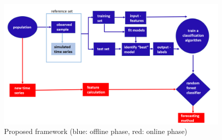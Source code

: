\documentclass[11pt,]{article}
\theoremstyle{definition}
\theoremstyle{definition}
\theoremstyle{definition}
\theoremstyle{remark}
\begin{document}
\begin{figure}

{\centering \includegraphics[width=\textwidth]{figures/framework} 

}

\caption{Proposed framework (blue: offline phase, red: online phase)}\label{fig:framework}
\end{figure}
\end{document}
